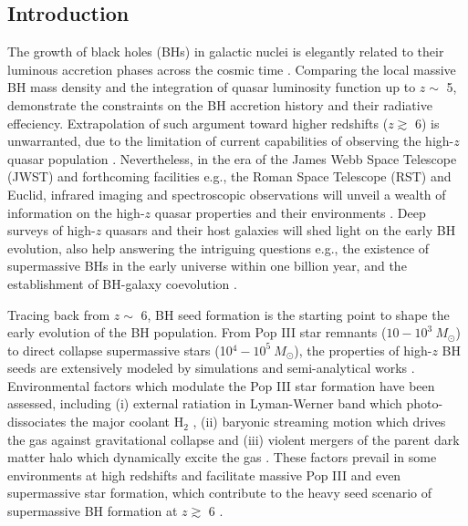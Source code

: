 \documentclass[twocolumn, twocolappendix]{aastex63}
\newcommand{\Msun}{M_\odot}
\newcommand{\hh}{\mathrm{H_2}}
\begin{document}
\begin{CJK*}{UTF8}{gbsn}
\vspace{5mm}
\section{Introduction} \label{sec:intro}
The growth of black holes (BHs) in galactic nuclei is elegantly related to their luminous accretion phases 
across the cosmic time \citep{1982MNRAS.200..115S,1992MNRAS.259..725S}. 
Comparing the local massive BH mass density and the integration of quasar luminosity function up to $z\sim$ 5, 
\citet{2002MNRAS.335..965Y} demonstrate the constraints on the BH accretion history and their radiative effeciency.
Extrapolation of such argument toward higher redshifts ($z\gtrsim$ 6) is unwarranted, 
due to the limitation of current capabilities of observing the high-$z$ quasar population \citep{2019BAAS...51c.121F}. 
Nevertheless, 
in the era of the James Webb Space Telescope (JWST) and forthcoming facilities 
e.g., the Roman Space Telescope (RST) and Euclid, 
infrared imaging and spectroscopic observations will unveil a wealth of information on the
high-$z$ quasar properties and their environments 
\citep{2019BAAS...51c..45R, 2019arXiv190205569A, 2011arXiv1110.3193L}. 
Deep surveys of high-$z$ quasars and their host galaxies will shed light on the early BH evolution, 
also help answering the intriguing questions e.g., 
the existence of supermassive BHs in the early universe within one billion year, 
and the establishment of BH-galaxy coevolution \citep{2012Sci...337..544V,2013ASSL..396..293H,2020ARA&A..58...27I}.

Tracing back from $z\sim$ 6, BH seed formation is the starting point to shape the early evolution of the BH population.
From Pop III star remnants ($10-10^3 ~\Msun$) to direct collapse supermassive stars (10$^4-10^5 ~\Msun$), 
the properties of high-$z$ BH seeds are extensively modeled by simulations and semi-analytical works 
\citep[e.g.,][Toyouchi 2022]{2001ApJ...546..635O,2002Sci...295...93A,2006ApJ...652....6Y,2011MNRAS.416.2748I,
2012ApJ...756...93H,2013ApJ...778..178H,2014MNRAS.439.3798F,
2014MNRAS.445L.109I,2014MNRAS.445..544S,2014MNRAS.445..107V,2020MNRAS.499.5960S}. 
Environmental factors which modulate the Pop III star formation have been assessed, 
including (i) external ratiation in Lyman-Werner band which photo-dissociates the major coolant $\hh$ 
\citep{2002ApJ...569..558O,2003Natur.425..812B,2010MNRAS.402.1249S},
(ii) baryonic streaming motion which drives the gas against gravitational collapse 
\citep{2012MNRAS.424.1335F, 2014MNRAS.439.1092T, 2018ApJ...855...17H}
and 
(iii) violent mergers of the parent dark matter halo which dynamically excite the gas 
\citep{2003ApJ...592..645Y,2019Natur.566...85W}. 
These factors prevail in some environments at high redshifts and facilitate massive Pop III and even supermassive star formation, 
which contribute to the heavy seed scenario of supermassive BH formation at $z\gtrsim$ 6 
\citep[see a review by][]{2020ARA&A..58...27I}. 


\end{CJK*}
\end{document}

